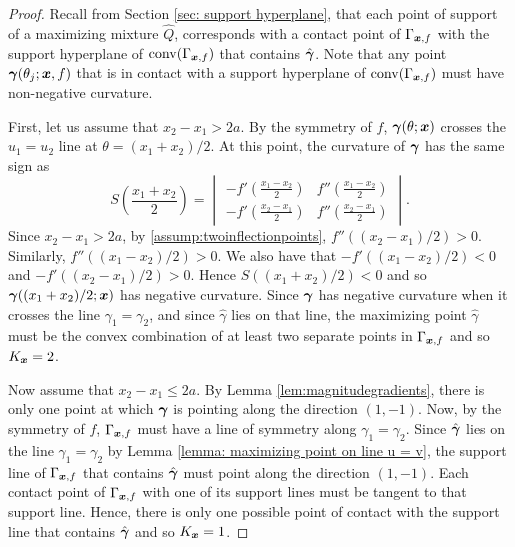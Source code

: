 \begin{proof}
			Recall from Section \ref{sec: support hyperplane}, that each point of support of a maximizing mixture $\hat{Q}$, corresponds with a contact point of $\Gamma_{{\bm{{x}}}, f}$ with the support hyperplane of $\mathrm{conv}(\Gamma_{{\bm{{x}}}, f})$ that contains $\hat{{\bm{{\gamma}}}}$. Note that any point ${\bm{{\gamma}}}(\theta_j;{\bm{{x}}},f)$ that is in contact with a support hyperplane of $\mathrm{conv}(\Gamma_{{\bm{{x}}}, f})$ must have non-negative curvature.

			First, let us assume that $x_2 - x_1 > 2a$. By the symmetry of $f$, ${\bm{{\gamma}}}(\theta;{\bm{{x}}})$ crosses the $u_1 = u_2$ line at $\theta = (x_1 + x_2)/2$. At this point, the curvature of ${\bm{{\gamma}}}$ has the same sign as
			\begin{equation}
				S\left(\frac{x_1+x_2}{2}\right) = 
				\begin{vmatrix}
					-f'(\frac{x_1 - x_2}{2}) & f''(\frac{x_1 - x_2}{2})\\
					-f'(\frac{x_2 - x_1}{2}) & f''(\frac{x_2 - x_1}{2})
				\end{vmatrix}.
			\end{equation}
			Since $x_2 - x_1 > 2a$, by \ref{assump:twoinflectionpoints},  $f''((x_2 - x_1)/2)>0$. Similarly, $f''((x_1 - x_2)/2) > 0$. We also have that $-f'((x_1 - x_2)/2) < 0$ and $-f'((x_2 - x_1)/2) > 0$. Hence $S((x_1 + x_2)/2)<0$ and so ${\bm{{\gamma}}}((x_1 + x_2)/2;{\bm{{x}}})$ has negative curvature. Since ${\bm{{\gamma}}}$ has negative curvature when it crosses the line $\gamma_1 = \gamma_2$, and since $\hat{\gamma}$ lies on that line, the maximizing point $\hat{\gamma}$ must be the convex combination of at least two separate points in $\Gamma_{{\bm{{x}}},f}$ and so $K_{\bm{{x}}} = 2$.

			
			Now assume that $x_2 - x_1 \leq 2a$. By Lemma \ref{lem:magnitudegradients}, there is only one point at which ${\bm{{\gamma}}}$ is pointing along the direction $(1,-1)$. Now, by the symmetry of $f$, $\Gamma_{{\bm{{x}}}, f}$ must have a line of symmetry along $\gamma_1 = \gamma_2$. Since $\hat{{\bm{{\gamma}}}}$ lies on the line $\gamma_1 = \gamma_2$ by Lemma \ref{lemma: maximizing point on line u = v}, the support line of $\Gamma_{{\bm{{x}}},f}$ that contains $\hat{{\bm{{\gamma}}}}$ must point along the direction $(1, -1)$. Each contact point of $\Gamma_{{\bm{{x}}}, f}$ with one of its support lines must be tangent to that support line. Hence, there is only one possible point of contact with the support line that contains $\hat{{\bm{{\gamma}}}}$ and so $K_{\bm{{x}}} = 1$.


\end{proof}

